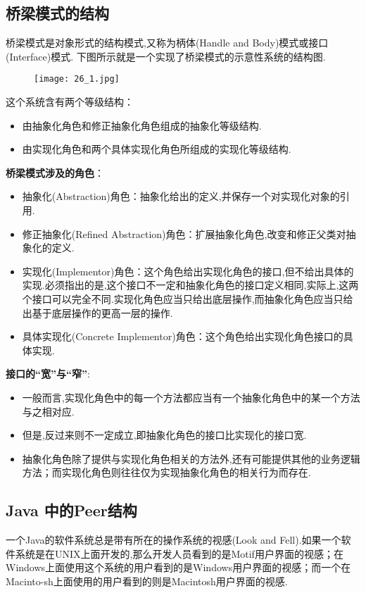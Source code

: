 \documentclass[../main.tex]{subfiles}
\begin{document}
\subsection{桥梁模式的结构}
桥梁模式是对象形式的结构模式,又称为柄体(Handle and Body)模式或接口(Interface)模式. 下图所示就是一个实现了桥梁模式的示意性系统的结构图.
%
\begin{figure}[H]
  \texttt{[image: 26\_1.jpg]}
\end{figure}
%
这个系统含有两个等级结构：
%
\begin{itemize}
  \item 由抽象化角色和修正抽象化角色组成的抽象化等级结构.
  \item 由实现化角色和两个具体实现化角色所组成的实现化等级结构.
\end{itemize}
%
\textbf{桥梁模式涉及的角色}：
\begin{itemize}
  \item 抽象化(Abstraction)角色：抽象化给出的定义,并保存一个对实现化对象的引用.
  \item 修正抽象化(Refined Abstraction)角色：扩展抽象化角色,改变和修正父类对抽象化的定义.
  \item 实现化(Implementor)角色：这个角色给出实现化角色的接口,但不给出具体的实现.必须指出的是,这个接口不一定和抽象化角色的接口定义相同,实际上,这两个接口可以完全不同.实现化角色应当只给出底层操作,而抽象化角色应当只给出基于底层操作的更高一层的操作.
  \item 具体实现化(Concrete Implementor)角色：这个角色给出实现化角色接口的具体实现.
\end{itemize}
%




%
\textbf{接口的``宽''与``窄''}:
%
\begin{itemize}
  \item 一般而言,实现化角色中的每一个方法都应当有一个抽象化角色中的某一个方法与之相对应.
  \item 但是,反过来则不一定成立,即抽象化角色的接口比实现化的接口宽.
  \item 抽象化角色除了提供与实现化角色相关的方法外,还有可能提供其他的业务逻辑方法；而实现化角色则往往仅为实现抽象化角色的相关行为而存在.
\end{itemize}
%
\subsection{Java 中的Peer结构}
一个Java的软件系统总是带有所在的操作系统的视感(Look and Fell).如果一个软件系统是在UNIX上面开发的,那么开发人员看到的是Motif用户界面的视感；在Windows上面使用这个系统的用户看到的是Windows用户界面的视感；而一个在Macinto-sh上面使用的用户看到的则是Macintosh用户界面的视感.
\end{document}
